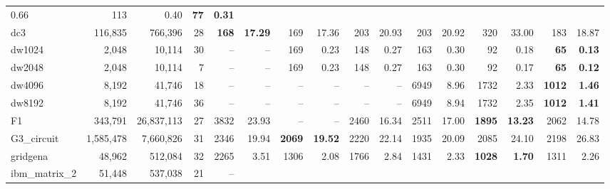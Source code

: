 \begin{landscape}
\begin{table}[p]
\begin{tabular}{lrrr||rr|rr|rr|rr|rr|rr}
            0.66  &      113 &     0.40  & \textbf{      77} & \textbf{    
            0.31}\\
                   dc3  &  116,835  &  766,396  &  28  & \textbf{     168} & 
                   \textbf{   17.29}  &      169 &    17.36  &      203 &    
                   20.93  &      203 &    20.92  &      320 &    33.00  &      
                   183 &    18.87\\
                dw1024  &  2,048  &  10,114  &  30  &       --  &       --   
                &      169 &     0.23  &      148 &     0.27  &      163 &     
                0.30  &       92 &     0.18  & \textbf{      65} & \textbf{    
                0.13}\\
                dw2048  &  2,048  &  10,114  &  7  &       --  &       --   
                &      169 &     0.23  &      148 &     0.27  &      163 &     
                0.30  &       92 &     0.17  & \textbf{      65} & \textbf{    
                0.12}\\
                dw4096  &  8,192  &  41,746  &  18  &       --  &       --   
                &       --  &       --   &       --  &       --   &     6949 
                &     8.96  &     1732 &     2.33  & \textbf{    1012} & 
                \textbf{    1.46}\\
                dw8192  &  8,192  &  41,746  &  36  &       --  &       --   
                &       --  &       --   &       --  &       --   &     6949 
                &     8.94  &     1732 &     2.35  & \textbf{    1012} & 
                \textbf{    1.41}\\
                    F1  &  343,791  &  26,837,113  &  27  &     3832 &    
                    23.93  &       --  &       --   &     2460 &    16.34  
                    &     2511 &    17.00  & \textbf{    1895} & \textbf{   
                    13.23}  &     2062 &    14.78\\
            G3\_circuit  &  1,585,478  &  7,660,826  &  31  &     2346 &    
            19.94  & \textbf{    2069} & \textbf{   19.52}  &     2220 &    
            22.14  &     1935 &    20.09  &     2085 &    24.10  &     2198 
            &    26.83\\
              gridgena  &  48,962  &  512,084  &  32  &     2265 &     3.51  
              &     1306 &     2.08  &     1766 &     2.84  &     1431 &     
              2.33  & \textbf{    1028} & \textbf{    1.70}  &     1311 &     
              2.26\\
          ibm\_matrix\_2  &  51,448  &  537,038  &  21  &       --  &       

\end{tabular}
\end{table}
\end{landscape}

